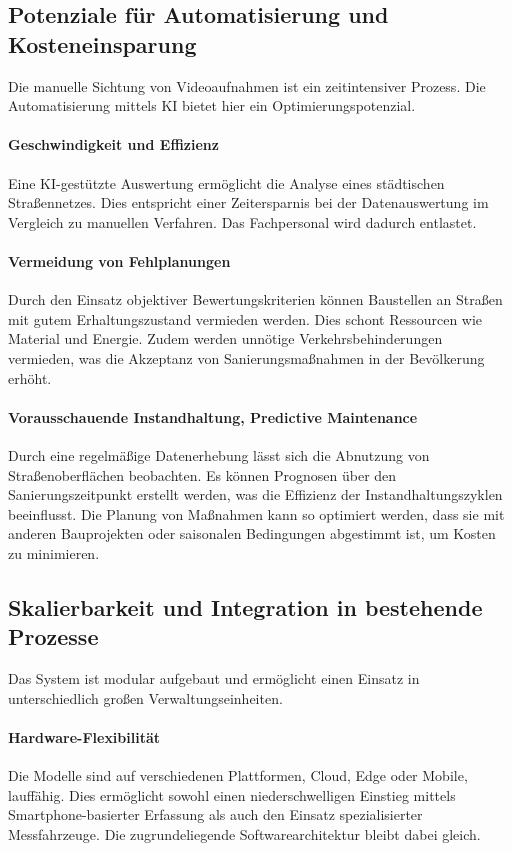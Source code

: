 \subsection{Potenziale für Automatisierung und Kosteneinsparung}
\label{subsec:automatisierung}

Die manuelle Sichtung von Videoaufnahmen ist ein zeitintensiver Prozess. Die Automatisierung mittels KI bietet hier ein Optimierungspotenzial.

\paragraph{Geschwindigkeit und Effizienz}
Eine KI-gestützte Auswertung ermöglicht die Analyse eines städtischen Straßennetzes. Dies entspricht einer Zeitersparnis bei der Datenauswertung im Vergleich zu manuellen Verfahren. Das Fachpersonal wird dadurch entlastet.

\paragraph{Vermeidung von Fehlplanungen}
Durch den Einsatz objektiver Bewertungskriterien können Baustellen an Straßen mit gutem Erhaltungszustand vermieden werden. Dies schont Ressourcen wie Material und Energie. Zudem werden unnötige Verkehrsbehinderungen vermieden, was die Akzeptanz von Sanierungsmaßnahmen in der Bevölkerung erhöht.

\paragraph{Vorausschauende Instandhaltung, Predictive Maintenance}
Durch eine regelmäßige Datenerhebung lässt sich die Abnutzung von Straßenoberflächen beobachten. Es können Prognosen über den Sanierungszeitpunkt erstellt werden, was die Effizienz der Instandhaltungszyklen beeinflusst. Die Planung von Maßnahmen kann so optimiert werden, dass sie mit anderen Bauprojekten oder saisonalen Bedingungen abgestimmt ist, um Kosten zu minimieren.

\subsection{Skalierbarkeit und Integration in bestehende Prozesse}
\label{subsec:skalierbarkeit}

Das System ist modular aufgebaut und ermöglicht einen Einsatz in unterschiedlich großen Verwaltungseinheiten.

\paragraph{Hardware-Flexibilität}
Die Modelle sind auf verschiedenen Plattformen, Cloud, Edge oder Mobile, lauffähig. Dies ermöglicht sowohl einen niederschwelligen Einstieg mittels Smartphone-basierter Erfassung als auch den Einsatz spezialisierter Messfahrzeuge. Die zugrundeliegende Softwarearchitektur bleibt dabei gleich.

